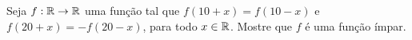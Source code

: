 \item
			Seja $f : {\mathbb R} \to {\mathbb R}$ uma função tal que $f (10 + x) = f (10 - x)$ e $f (20 + x) = -f (20 - x)$,
para todo $x \in {\mathbb R}$. Mostre que $f$ é uma função ímpar.
